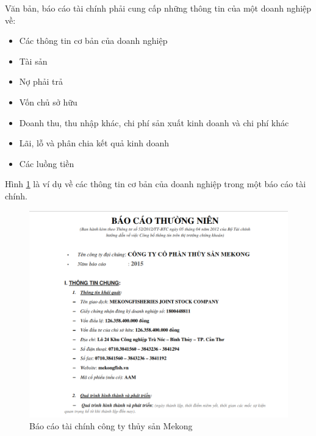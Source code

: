 \documentclass[14pt]{extreport}
\begin{document}
Văn bản, báo cáo tài chính phải cung cấp những thông tin của một doanh nghiệp về:
\begin{itemize}
    \item Các thông tin cơ bản của doanh nghiệp
    \item Tài sản
    \item Nợ phải trả
    \item Vốn chủ sở hữu
    \item Doanh thu, thu nhập khác, chi phí sản xuất kinh doanh và chi phí khác
    \item Lãi, lỗ và phân chia kết quả kinh doanh
    \item Các luồng tiền
\end{itemize}
Hình \ref{fig:sub1} là ví dụ về các thông tin cơ bản của doanh nghiệp trong một báo cáo tài chính.
\begin{figure}
\centering
  \includegraphics[width=1\linewidth]{image/baocao1.PNG}
  \caption{Báo cáo tài chính công ty thủy sản Mekong}
  \label{fig:sub1}
\end{figure}
\end{document}
